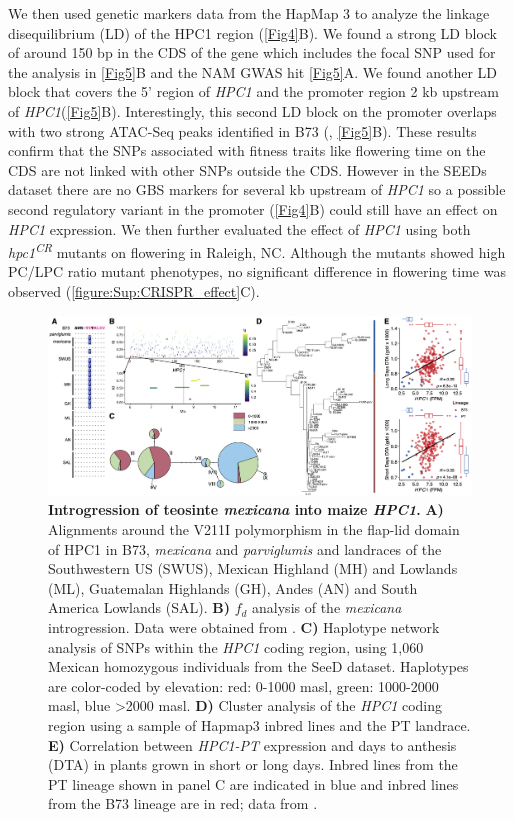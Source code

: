 \documentclass[9pt,twocolumn,twoside,lineno]{biorxiv}
\newcommand{\mex}{\textit{mexicana}\xspace}
\newcommand{\hpc}{\textit{HPC1}\xspace}
\newcommand{\parv}{\textit{parviglumis}\xspace}
\begin{document}
We then used genetic markers data from the HapMap 3 \cite{Bukowski2017-ng} to analyze the linkage disequilibrium (LD) of the HPC1 region (\cref{Fig4}B).
We found a strong LD block of around 150 bp in the CDS of the gene which includes the focal SNP used for the analysis in \cref{Fig5}B and the  NAM GWAS hit \cref{Fig5}A. 
We found another LD block that covers the 5' region of \hpc and the promoter region 2 kb upstream of \hpc (\cref{Fig5}B). 
Interestingly, this second LD block on the promoter overlaps with two strong ATAC-Seq peaks identified in B73 (\cite{Ricci2019-zj}, \cref{Fig5}B).
These results confirm that the SNPs associated with fitness traits like flowering time on the  CDS are not linked with other SNPs outside the  CDS.
However in the SEEDs dataset there are no GBS markers for several kb upstream of \hpc so a possible second regulatory variant in the promoter (\cref{Fig4}B) could still have an effect on \hpc expression. We then further evaluated the effect of \hpc using both \textit{hpc1\textsuperscript{CR}} mutants on flowering in Raleigh, NC. 
Although the mutants showed high PC/LPC ratio mutant phenotypes, no significant difference in flowering time was observed (\cref{figure:Sup:CRISPR_effect}C). 
\begin{figure}[!ht]
\includegraphics[width=0.8\paperwidth]{Figures/Fig_6.png}
\caption{\textbf{Introgression of teosinte \mex into maize \hpc.}  
\textbf{A)} Alignments around the V211I polymorphism in the flap-lid domain of HPC1 in B73, \mex and \parv and landraces of the Southwestern US (SWUS), Mexican Highland (MH) and Lowlands (ML), Guatemalan Highlands (GH), Andes (AN) and South America Lowlands (SAL).
\textbf{B)} \(f_d\) analysis of the \mex introgression. Data were obtained from \cite{Gonzalez-Segovia2019-jy}. 
\textbf{C)} Haplotype network analysis of SNPs within the \hpc coding region, using 1,060 Mexican homozygous individuals from the SeeD dataset. Haplotypes are color-coded by elevation: red: 0-1000 masl, green: 1000-2000 masl, blue >2000 masl.
\textbf{D)} Cluster analysis of the \hpc coding region using a sample of Hapmap3 inbred lines and the PT landrace.
\textbf{E)} Correlation between \textit{HPC1-PT} expression and days to anthesis (DTA) in plants grown in short or long days. 
Inbred lines from the PT lineage shown in panel C are indicated in blue and inbred lines from the B73 lineage are in red;
data from \cite{Kremling2018-gn}.}
\label{Fig6}
\end{figure}
\end{document}
